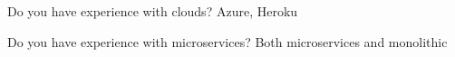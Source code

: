 


\begin{minipage}[t]{0.76\textwidth}
    \vspace{-\baselineskip} %


    \begin{entrylist}
        \entry
        {}
        {Do you have experience with clouds?}
        {}
        {
            Azure, Heroku
        }

        \entry
        {}
        {Do you have experience with microservices?}
        {}
        {
            Both microservices and monolithic
        }
    \end{entrylist}
\end{minipage}
